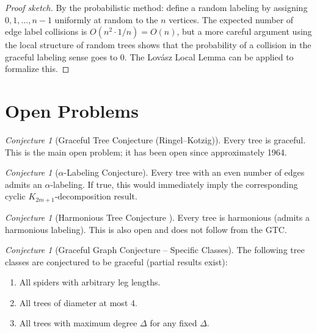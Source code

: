 \documentclass[12pt,a4paper]{amsart}
\theoremstyle{definition}
\theoremstyle{remark}
\newtheorem{conjecture}[theorem]{Conjecture}
\begin{document}
\begin{proof}[Proof sketch]
By the probabilistic method: define a random labeling by assigning $0, 1, \ldots, n-1$
uniformly at random to the $n$ vertices. The expected number of edge label collisions
is $O(n^2 \cdot 1/n) = O(n)$, but a more careful argument using the local structure
of random trees shows that the probability of a collision in the graceful labeling
sense goes to 0. The Lovász Local Lemma can be applied to formalize this.
\end{proof}

\section{Open Problems}\label{sec:open}

\begin{conjecture}[Graceful Tree Conjecture (Ringel--Kotzig)]\label{conj:gtc_main}
Every tree is graceful. This is the main open problem; it has been open since
approximately 1964.
\end{conjecture}

\begin{conjecture}[$\alpha$-Labeling Conjecture]\label{conj:alpha}
Every tree with an even number of edges admits an $\alpha$-labeling. If true,
this would immediately imply the corresponding cyclic $K_{2m+1}$-decomposition
result.
\end{conjecture}

\begin{conjecture}[Harmonious Tree Conjecture \cite{GrahamSloane1980}]\label{conj:harm}
Every tree is harmonious (admits a harmonious labeling). This is also open and
does not follow from the GTC.
\end{conjecture}

\begin{conjecture}[Graceful Graph Conjecture -- Specific Classes]\label{conj:specific}
The following tree classes are conjectured to be graceful (partial results exist):
\begin{enumerate}[label=(\roman*)]
  \item All spiders with arbitrary leg lengths.
  \item All trees of diameter at most 4.
  \item All trees with maximum degree $\Delta$ for any fixed $\Delta$.
\end{enumerate}
\end{conjecture}
\end{document}
